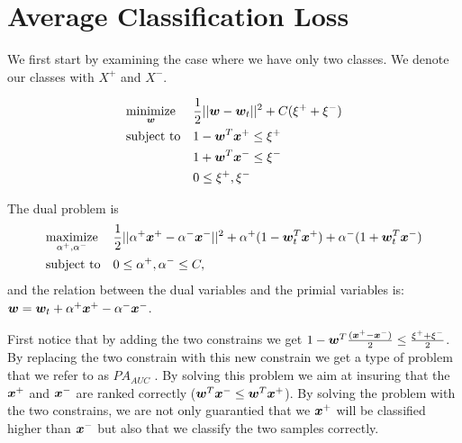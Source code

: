 \section{Average Classification Loss}

We first start by examining the case where we have only two classes. We denote our classes with $X^+$ and $X^-$.

\begin{equation*}
\begin{aligned}
& \underset{\bm{w}}{\text{minimize}}
& & \frac{1}{2} || \bm{w} - \bm{w}_t ||^2 + C ( \xi^+ + \xi^- ) \\
& \text{subject to}
& & 1 - \bm{w}^T \bm{x}^+ \leq \xi^+\\
& & & 1 + \bm{w}^T \bm{x}^-  \leq \xi^- \\
& & & 0 \leq \xi^+, \xi^-
\end{aligned}
\end{equation*}

The dual problem is 
\begin{equation*}
\begin{aligned}
& \underset{\alpha^+, \alpha^-}{\text{maximize}}
& & \frac{1}{2} || \alpha^+ \bm{x}^+ - \alpha^- \bm{x}^-||^2 + \alpha^+ (1 - \bm{w}_t^T \bm{x}^+ ) + \alpha^- (1 + \bm{w}_t^T \bm{x}^- )\\
& \text{subject to}
& & 0 \leq \alpha^+,\alpha^- \leq C, 
\end{aligned}
\end{equation*}
 and the relation between the dual variables and the primial variables is: $\bm{w} = \bm{w}_t + \alpha^+ \bm{x}^+ - \alpha^- \bm{x}^- $.

First notice that by adding the two constrains we get $1 - \bm{w}^T \frac{(\bm{x}^+ - \bm{x}^- )}{2} \leq \frac{\xi^+ + \xi^-}{2}$. By replacing the two constrain with this new constrain we get a type of problem that we refer to as $PA_{AUC}$ \cite{Keshet2009}. By solving this problem we aim at insuring that the $\bm{x}^+$ and $\bm{x}^-$ are ranked correctly ($ \bm{w}^T \bm{x}^- \leq \bm{w}^T \bm{x}^+ $).  By solving the problem with the two constrains, we are not only guarantied that we $\bm{x}^+$ will be classified higher than $\bm{x}^-$ but also that we classify the two samples correctly. 

